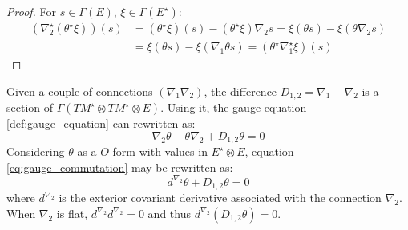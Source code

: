  \begin{proof}
 For $s \in \Gamma(E), \, \xi \in \Gamma(E^\star)$:
 \begin{align}
     \left(\nabla_2^\star (\theta^\star \xi)\right)\left(
     s\right) & = \left(\theta^\star \xi\right)(s) - 
     \left(\theta^\star \xi\right)\nabla_2 s 
     = \xi \left( \theta s \right) - \xi \left( \theta \nabla_2 s \right) \\
     & = \xi \left( \theta s \right) - \xi \left( \nabla_1 
     \theta s \right) 
      = \left(\theta^\star \nabla_1^\star \xi \right)(s)
 \end{align}
 \end{proof}
 Given a couple of connections $\left(\nabla_1 \nabla_2\right)$, the difference $D_{1,2} = \nabla_1 - \nabla_2$ is a section of $\Gamma\left( 
 TM^\star \otimes TM^\star \otimes E\right).$ Using it, the gauge equation \ref{def:gauge_equation} can rewritten as:
 \begin{equation}
     \label{eq:gauge_commutation}
     \nabla_2 \theta - \theta \nabla_2 + D_{1,2} \theta = 0
 \end{equation}
Considering $\theta$ as a $O$-form with values in $E^\star \otimes E$, equation \ref{eq:gauge_commutation} may be rewritten as:
\begin{equation}
    d^{\nabla_2} \theta + D_{1,2}\theta = 0
\end{equation}
where $d^{\nabla_2}$ is the exterior covariant derivative
associated with the connection $\nabla_2.$ When $\nabla_2$ is flat, $d^{\nabla_2}d^{\nabla_2} = 0$ and thus 
$d^{\nabla_2}(D_{1,2}\theta) = 0.$

